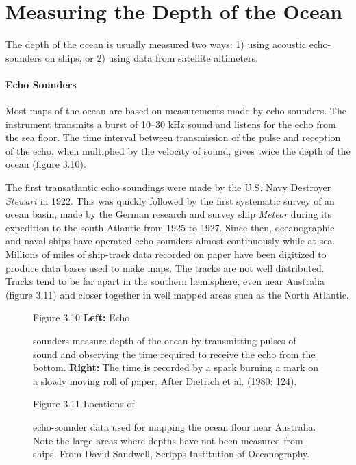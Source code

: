 \section{Measuring the Depth of the Ocean}
The depth of the ocean is usually measured two ways: 1) using acoustic
echo-sounders on ships, or 2) using data from satellite altimeters.

\paragraph{Echo Sounders} Most maps of the ocean are based
on measurements made by echo sounders. The instrument transmits a burst of 10--30 kHz
sound and listens for the echo from the sea floor. The time
interval between transmission of the pulse and reception of the echo, when multiplied by the
velocity of sound, gives twice the depth of the ocean (figure 3.10).

The first transatlantic echo soundings were made by the U.S. Navy
Destroyer \textit{Stewart} in 1922. This was quickly followed by
the first systematic survey of an ocean basin, made by the German
research and survey ship \textit{Meteor} during its expedition to
the south Atlantic from 1925 to 1927. Since then, oceanographic
and naval ships have operated echo sounders almost continuously
while at sea. Millions of miles of ship-track data recorded on
paper have been digitized to produce data bases used to make maps.
The tracks are not well distributed. Tracks tend to be far apart
in the southern hemisphere, even near Australia (figure 3.11) and
closer together in well mapped areas such as the North
Atlantic.

\begin{figure}[t!]
\footnotesize
Figure 3.10 \textbf{Left:} Echo \rule{0ex}{5ex}sounders measure depth of the ocean
by transmitting pulses of sound and observing the time
required to receive the echo from the bottom. \textbf{Right:} The time is recorded by a spark
burning a mark on a slowly moving roll of paper. After Dietrich et al. (1980: 124).
\label{fig:Sonar}
\vspace{-3ex}
\end{figure}

\begin{figure}[t!]
\footnotesize
Figure 3.11  Locations of \rule{0pt}{5ex}echo-sounder data
used for mapping the ocean floor near Australia. Note the large areas
where depths have not been measured from ships. From David Sandwell, Scripps Institution of
Oceanography.

\label{fig:shiptracks10}
\vspace{-3ex}
\end{figure}

